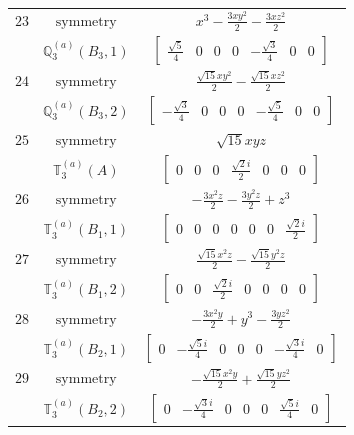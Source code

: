 \documentclass[fleqn,8pt,landscape]{jsarticle}
\begin{document}
\begin{longtable}{ccc}
$ 23 $ & $ \text{symmetry} $ & $ x^{3} - \frac{3 x y^{2}}{2} - \frac{3 x z^{2}}{2} $ \\
$  $ & $ \mathbb{Q}_{3}^{(a)}(B_{3},1) $ & $ \begin{bmatrix} \frac{\sqrt{5}}{4} & 0 & 0 & 0 & - \frac{\sqrt{3}}{4} & 0 & 0 \end{bmatrix} $ \\ \hline
$ 24 $ & $ \text{symmetry} $ & $ \frac{\sqrt{15} x y^{2}}{2} - \frac{\sqrt{15} x z^{2}}{2} $ \\
$  $ & $ \mathbb{Q}_{3}^{(a)}(B_{3},2) $ & $ \begin{bmatrix} - \frac{\sqrt{3}}{4} & 0 & 0 & 0 & - \frac{\sqrt{5}}{4} & 0 & 0 \end{bmatrix} $ \\ \hline
$ 25 $ & $ \text{symmetry} $ & $ \sqrt{15} x y z $ \\
$  $ & $ \mathbb{T}_{3}^{(a)}(A) $ & $ \begin{bmatrix} 0 & 0 & 0 & \frac{\sqrt{2} i}{2} & 0 & 0 & 0 \end{bmatrix} $ \\ \hline
$ 26 $ & $ \text{symmetry} $ & $ - \frac{3 x^{2} z}{2} - \frac{3 y^{2} z}{2} + z^{3} $ \\
$  $ & $ \mathbb{T}_{3}^{(a)}(B_{1},1) $ & $ \begin{bmatrix} 0 & 0 & 0 & 0 & 0 & 0 & \frac{\sqrt{2} i}{2} \end{bmatrix} $ \\ \hline
$ 27 $ & $ \text{symmetry} $ & $ \frac{\sqrt{15} x^{2} z}{2} - \frac{\sqrt{15} y^{2} z}{2} $ \\
$  $ & $ \mathbb{T}_{3}^{(a)}(B_{1},2) $ & $ \begin{bmatrix} 0 & 0 & \frac{\sqrt{2} i}{2} & 0 & 0 & 0 & 0 \end{bmatrix} $ \\ \hline
$ 28 $ & $ \text{symmetry} $ & $ - \frac{3 x^{2} y}{2} + y^{3} - \frac{3 y z^{2}}{2} $ \\
$  $ & $ \mathbb{T}_{3}^{(a)}(B_{2},1) $ & $ \begin{bmatrix} 0 & - \frac{\sqrt{5} i}{4} & 0 & 0 & 0 & - \frac{\sqrt{3} i}{4} & 0 \end{bmatrix} $ \\ \hline
$ 29 $ & $ \text{symmetry} $ & $ - \frac{\sqrt{15} x^{2} y}{2} + \frac{\sqrt{15} y z^{2}}{2} $ \\
$  $ & $ \mathbb{T}_{3}^{(a)}(B_{2},2) $ & $ \begin{bmatrix} 0 & - \frac{\sqrt{3} i}{4} & 0 & 0 & 0 & \frac{\sqrt{5} i}{4} & 0 \end{bmatrix} $ \\ \hline

\end{longtable}
\end{document}
